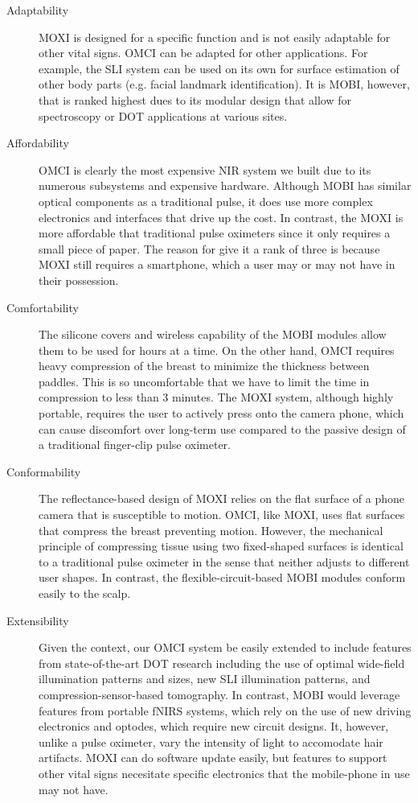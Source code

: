 \begin{description}
   \item[Adaptability] \ac{MOXI} is designed for a specific function and is not easily adaptable for other vital signs. \ac{OMCI} can be adapted for other applications. For example, the \ac{SLI} system can be used on its own for surface estimation of other body parts (e.g. facial landmark identification). It is \ac{MOBI}, however, that is ranked highest dues to its modular design that allow for spectroscopy or \ac{DOT} applications at various sites. 
   
   \item[Affordability] \ac{OMCI} is clearly the most expensive \ac{NIR} system we built due to its numerous subsystems and expensive hardware. Although \ac{MOBI} has similar optical components as a traditional pulse, it does use more complex electronics and interfaces that drive up the cost. In contrast, the \ac{MOXI} is more affordable that traditional pulse oximeters since it only requires a small piece of paper. The reason for give it a rank of three is because \ac{MOXI} still requires a smartphone, which a user may or may not have in their possession. 
  
   \item[Comfortability] The silicone covers and wireless capability of the \ac{MOBI} modules allow them to be used for hours at a time. On the other hand, \ac{OMCI} requires heavy compression of the breast to minimize the thickness between paddles. This is so uncomfortable that we have to limit the time in compression to less than 3 minutes. The \ac{MOXI} system, although highly portable, requires the user to actively press onto the camera phone, which can cause discomfort over long-term use compared to the passive design of a traditional finger-clip pulse oximeter. 
   
   \item[Conformability] The reflectance-based design of \ac{MOXI} relies on the flat surface of a phone camera that is susceptible to motion. \ac{OMCI}, like \ac{MOXI}, uses flat surfaces that compress the breast preventing motion. However, the mechanical principle of compressing tissue using two fixed-shaped surfaces is identical to a traditional pulse oximeter in the sense that neither adjusts to different user shapes. In contrast, the flexible-circuit-based \ac{MOBI} modules conform easily to the scalp. 
   
   \item[Extensibility] Given the context, our \ac{OMCI} system be easily extended to include features from state-of-the-art \ac{DOT} research including the use of optimal wide-field illumination patterns and sizes, new \ac{SLI} illumination patterns, and compression-sensor-based tomography.  In contrast, \ac{MOBI} would leverage features from portable fNIRS systems, which rely on the use of new driving electronics and optodes, which require new circuit designs. It, however, unlike a pulse oximeter, vary the intensity of light to accomodate hair artifacts. \ac{MOXI} can do software update easily, but features to support other vital signs necesitate specific electronics that the mobile-phone in use may not have. 
   

\end{description}
